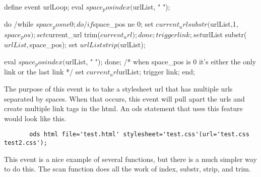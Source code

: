 \begin{sfvcode}
        define event urlLoop;
            eval $space_pos index($urlList, " ");

            do /while $space_pos ne 0;

                do /if $space_pos ne 0;
                    set $current_url substr($urlList,1,$space_pos);
                    set $current_url trim($current_url);
                done;

                trigger link;

                set $urlList substr($urlList,$space_pos);
                set $urlList strip($urlList);

                eval $space_pos index($urlList, " ");
            done;
            /* when space_pos is 0 it's either the only link or the last link */
            set $current_url $urlList;
            trigger link;
        end;
\end{sfvcode}

The purpose of this event is to take a stylesheet url that has multiple urls
separated by spaces.  When that occurs, this event will pull apart the 
urls and create multiple link tags in the html.  An ods statement that uses
this feature would look like this.

\begin{verbatim}
       ods html file='test.html' stylesheet='test.css'(url='test.css test2.css');
\end{verbatim}

This event is a nice example of several functions, but there is a much
simpler way to do this.  The scan function does all the work of index,
substr, strip, and trim.


